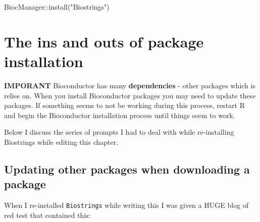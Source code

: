 \documentclass[
]{book}
\newenvironment{Shaded}{\begin{snugshade}}{\end{snugshade}}
\newcommand{\FunctionTok}[1]{\textcolor[rgb]{0.00,0.00,0.00}{#1}}
\newcommand{\NormalTok}[1]{#1}
\newcommand{\SpecialCharTok}[1]{\textcolor[rgb]{0.00,0.00,0.00}{#1}}
\newcommand{\StringTok}[1]{\textcolor[rgb]{0.31,0.60,0.02}{#1}}
\begin{document}
\begin{Shaded}
\begin{Highlighting}[]
\NormalTok{BiocManager}\SpecialCharTok{::}\FunctionTok{install}\NormalTok{(}\StringTok{"Biostrings"}\NormalTok{)}
\end{Highlighting}
\end{Shaded}

\hypertarget{the-ins-and-outs-of-package-installation}{%
\section{The ins and outs of package installation}\label{the-ins-and-outs-of-package-installation}}

\textbf{IMPORANT} Bioconductor has many \textbf{dependencies} - other packages which is relies on. When you install Bioconductor packages you may need to update these packages. If something seems to not be working during this process, restart R and begin the Bioconductor installation process until things seem to work.

Below I discuss the series of prompts I had to deal with while re-installing Biostrings while editing this chapter.

\hypertarget{updating-other-packages-when-downloading-a-package}{%
\subsection{Updating other packages when downloading a package}\label{updating-other-packages-when-downloading-a-package}}

When I re-installed \texttt{Biostrings} while writing this I was given a HUGE blog of red test that contained this:
\end{document}
